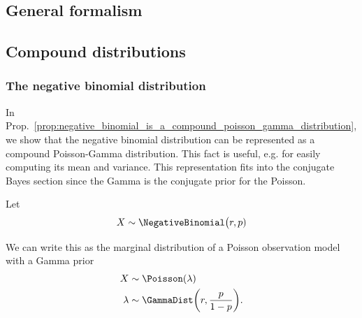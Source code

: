 \documentclass{article} %
\begin{document}
\subsection{General formalism} \label{sec:ef_general_formalism}



\subsection{Compound distributions}

\subsubsection{The negative binomial distribution}

In Prop.~\ref{prop:negative_binomial_is_a_compound_poisson_gamma_distribution}, we show that the negative binomial distribution can be represented as a compound Poisson-Gamma distribution.  This fact is useful, e.g. for easily computing its mean and variance.  This representation fits into the conjugate Bayes section since the Gamma is the conjugate prior for the Poisson. 

\begin{proposition}

Let
\[X \sim \NegativeBinomial\big(r, p) \]

We can write this as the marginal distribution of a Poisson observation model with a Gamma prior
%
\begin{align*}
X &\sim \Poisson(\lambda) \\
\lambda &\sim \GammaDist \bigg(r, \frac{p}{1-p}\bigg). 
\end{align*}
\label{prop:negative_binomial_is_a_compound_poisson_gamma_distribution}
\end{proposition}
\end{document}
